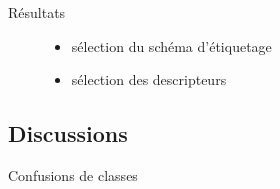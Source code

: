 \begin{frame}{Résultats}
\begin{figure}
	\begin{itemize}
		\item sélection du schéma d'étiquetage
		\item sélection des descripteurs
	\end{itemize}
\end{figure}
\end{frame}

\subsection{Discussions}
\begin{frame}{Confusions de classes}

\end{frame}


